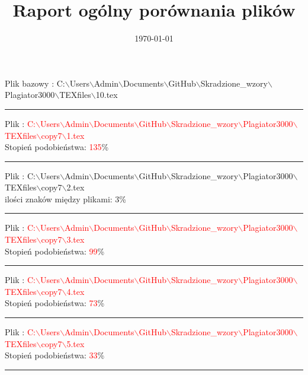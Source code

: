 \documentclass{article}
\begin{document}
\title{\huge\bfseries Raport ogólny porównania plików }
\date{\today}
\maketitle
\begin{flushleft}
Plik bazowy : C:$\backslash$Users$\backslash$Admin$\backslash$Documents$\backslash$GitHub$\backslash$Skradzione\_wzory$\backslash$Plagiator3000$\backslash$TEXfiles$\backslash$10.tex
\end{flushleft}
\hrule
\begin{flushleft}
Plik : \textcolor{Red}{C:$\backslash$Users$\backslash$Admin$\backslash$Documents$\backslash$GitHub$\backslash$Skradzione\_wzory$\backslash$Plagiator3000$\backslash$TEXfiles$\backslash$copy7$\backslash$1.tex}\\
{\huge Stopień podobieństwa: \textcolor{Red}{135}\%} \\ 

\end{flushleft}
\hrule
\begin{flushleft}
Plik : C:$\backslash$Users$\backslash$Admin$\backslash$Documents$\backslash$GitHub$\backslash$Skradzione\_wzory$\backslash$Plagiator3000$\backslash$TEXfiles$\backslash$copy7$\backslash$2.tex\\
{ ilości znaków między plikami: 3\%} \\ 

\end{flushleft}
\hrule
\begin{flushleft}
Plik : \textcolor{Red}{C:$\backslash$Users$\backslash$Admin$\backslash$Documents$\backslash$GitHub$\backslash$Skradzione\_wzory$\backslash$Plagiator3000$\backslash$TEXfiles$\backslash$copy7$\backslash$3.tex}\\
{\huge Stopień podobieństwa: \textcolor{Red}{99}\%} \\ 

\end{flushleft}
\hrule
\begin{flushleft}
Plik : \textcolor{Red}{C:$\backslash$Users$\backslash$Admin$\backslash$Documents$\backslash$GitHub$\backslash$Skradzione\_wzory$\backslash$Plagiator3000$\backslash$TEXfiles$\backslash$copy7$\backslash$4.tex}\\
{\huge Stopień podobieństwa: \textcolor{Red}{73}\%} \\ 

\end{flushleft}
\hrule
\begin{flushleft}
Plik : \textcolor{Red}{C:$\backslash$Users$\backslash$Admin$\backslash$Documents$\backslash$GitHub$\backslash$Skradzione\_wzory$\backslash$Plagiator3000$\backslash$TEXfiles$\backslash$copy7$\backslash$5.tex}\\
{\huge Stopień podobieństwa: \textcolor{Red}{33}\%} \\ 

\end{flushleft}
\hrule
\end{document}
